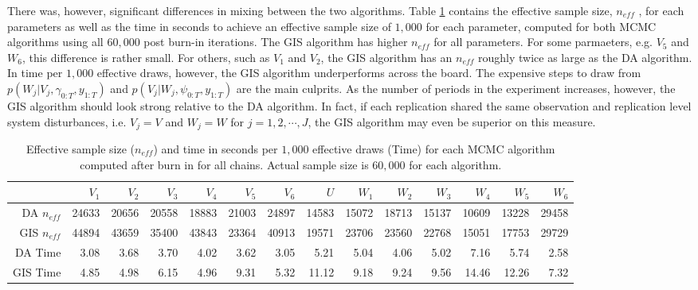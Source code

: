 \documentclass[graybox]{svmult}
\begin{document}
There was, however, significant differences in mixing between the two algorithms. Table \ref{tab:neff} contains the effective sample size, $n_{eff}$ \citep{gelman2013bayesian}, for each parameters as well as the time in seconds to achieve an effective sample size of $1,000$ for each parameter, computed for both MCMC algorithms using all $60,000$ post burn-in iterations. The GIS algorithm has higher $n_{eff}$ for all parameters. For some parmaeters, e.g. $V_5$ and $W_6$, this difference is rather small. For others, such as $V_1$ and $V_2$, the GIS algorithm has an $n_{eff}$ roughly twice as large as the DA algorithm. In time per $1,000$ effective draws, however, the GIS algorithm underperforms across the board. The expensive steps to draw from $p(W_j|V_j,\gamma_{0:T},y_{1:T})$ and $p(V_j|W_j,\psi_{0:T},y_{1:T})$ are the main culprits. As the number of periods in the experiment increases, however, the GIS algorithm should look strong relative to the DA algorithm. In fact, if each replication shared the same observation and replication level system disturbances, i.e. $V_j=V$ and $W_j=W$ for $j=1,2,\cdots,J$, the GIS algorithm may even be superior on this measure. 

\begin{table}[ht]
\centering
\begin{tabular}{rrrrrrrrrrrrrr}
  \hline
 & $V_1$ & $V_2$ & $V_3$ & $V_4$ & $V_5$ & $V_6$ & $U$ & $W_1$ & $W_2$ & $W_3$ & $W_4$ & $W_5$ & $W_6$ \\ 
  \hline
DA $n_{eff}$ & 24633 & 20656 & 20558 & 18883 & 21003 & 24897 & 14583 & 15072 & 18713 & 15137 & 10609 & 13228 & 29458 \\ 
GIS $n_{eff}$   & 44894 & 43659 & 35400 & 43843 & 23364 & 40913 & 19571 & 23706 & 23560 & 22768 & 15051 & 17753 & 29729 \\ 
DA Time & 3.08 & 3.68 & 3.70 & 4.02 & 3.62 & 3.05 & 5.21 & 5.04 & 4.06 & 5.02 & 7.16 & 5.74 & 2.58 \\ 
GIS Time & 4.85 & 4.98 & 6.15 & 4.96 & 9.31 & 5.32 & 11.12 & 9.18 & 9.24 & 9.56 & 14.46 & 12.26 & 7.32 \\ 
   \hline
\end{tabular}
\label{tab:neff}
\caption{Effective sample size ($n_{eff}$) and time in seconds per $1,000$ effective draws (Time) for each MCMC algorithm computed after burn in for all chains. Actual sample size is $60,000$ for each algorithm.}
\end{table}
\end{document}

